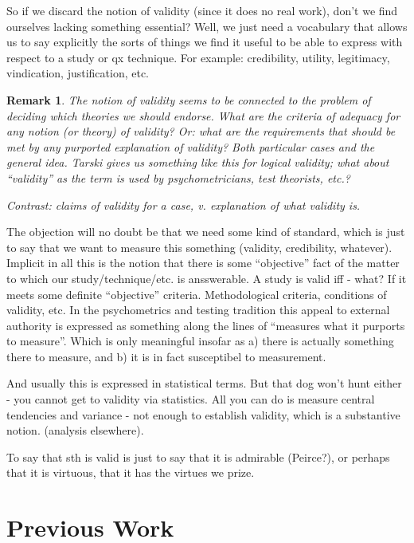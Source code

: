 \documentclass[11pt,twoside]{article}
\newtheorem{remark}{Remark}
\begin{document}
So if we discard the notion of validity (since it does no real work),
don't we find ourselves lacking something essential?  Well, we just
need a vocabulary that allows us to say explicitly the sorts of things
we find it useful to be able to express with respect to a study or qx
technique.  For example: credibility, utility, legitimacy,
vindication, justification, etc.

\begin{remark}
  The notion of validity seems to be connected to the problem of
  deciding which theories we should endorse.  What are the criteria of
  adequacy for any notion (or theory) of validity?  Or: what are the
  requirements that should be met by any purported explanation of
  validity?  Both particular cases and the general idea.  Tarski gives
  us something like this for logical validity; what about ``validity''
  as the term is used by psychometricians, test theorists, etc.?

Contrast: claims of validity for a case, v. explanation of what
validity is.


\end{remark}

The objection will no doubt be that we need some kind of standard,
which is just to say that we want to measure this something (validity,
credibility, whatever).  Implicit in all this is the notion that there
is some ``objective'' fact of the matter to which our
study/technique/etc. is ansswerable. A study is valid iff - what?  If
it meets some definite ``objective'' criteria.  Methodological
criteria, conditions of validity, etc.  In the psychometrics and
testing tradition this appeal to external authority is expressed as
something along the lines of ``measures what it purports to measure''.
Which is only meaningful insofar as a) there is actually something
there to measure, and b) it is in fact susceptibel to measurement.

And usually this is expressed in statistical terms.  But that dog
won't hunt either - you cannot get to validity via statistics.  All
you can do is measure central tendencies and variance - not enough to
establish validity, which is a substantive notion. (analysis
elsewhere).

To say that sth is valid is just to say that it is admirable
(Peirce?), or perhaps that it is virtuous, that it has the virtues we
prize.

\section{Previous Work}
\label{sub:PreviousWork}
\end{document}

